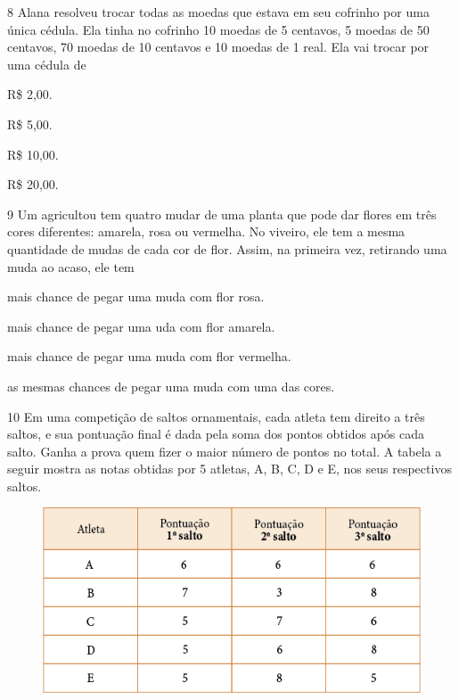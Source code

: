 \num{8} Alana resolveu trocar todas as moedas que estava em seu cofrinho por uma
única cédula. Ela tinha no cofrinho 10 moedas de 5 centavos, 5 moedas de
50 centavos, 70 moedas de 10 centavos e 10 moedas de 1 real. Ela vai trocar por uma cédula de

\begin{escolha}
\item R\$ 2,00.
\item R\$ 5,00.
\item R\$ 10,00.
\item R\$ 20,00.
\end{escolha}


\num{9} Um agricultou tem quatro mudar de uma planta que pode dar flores em três cores diferentes: amarela, rosa ou vermelha. No viveiro, ele tem a mesma quantidade de mudas de cada cor de flor. Assim, na primeira vez, retirando uma muda ao acaso, ele tem

\begin{escolha}
\item mais chance de pegar uma muda com flor rosa.
\item mais chance de pegar uma uda com flor amarela.
\item mais chance de pegar uma muda com flor vermelha.
\item as mesmas chances de pegar uma muda com uma das cores.
\end{escolha}


\num{10} Em uma competição de saltos ornamentais, cada atleta tem direito a três saltos,
e sua pontuação final é dada pela soma dos pontos obtidos após cada salto. Ganha a prova quem
fizer o maior número de pontos no total. A tabela a seguir mostra as notas obtidas por 5 atletas, A, B, C, D e E, nos seus respectivos saltos.

\begin{figure}[htpb!]
\centering
\includegraphics[width=\textwidth]{media/image88.png}
\end{figure}


